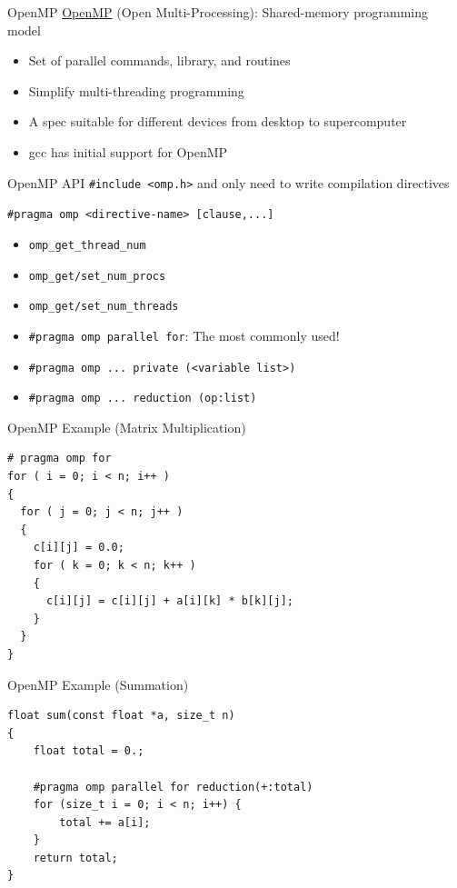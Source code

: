 \documentclass{../TexTemplate/myslide}
\begin{document}
\begin{frame}{OpenMP}
\href{https://www.openmp.org/}{OpenMP} (Open Multi-Processing): Shared-memory programming model
\begin{itemize}
	\item Set of parallel commands, library, and routines
	\item Simplify multi-threading programming
	\item A spec suitable for different devices from desktop to supercomputer
	\item gcc has initial support for OpenMP
\end{itemize}
\end{frame}

\begin{frame}[fragile]{OpenMP API}
\verb'#include <omp.h>' and only need to write compilation directives
\begin{center}
\verb'#pragma omp <directive-name> [clause,...]'
\end{center}
\begin{itemize}
	\item \verb'omp_get_thread_num'
	\item \verb'omp_get/set_num_procs'
	\item \verb'omp_get/set_num_threads'
	\item \verb'#pragma omp parallel for': The most commonly used!
	\item \verb'#pragma omp ... private (<variable list>)'
	\item \verb'#pragma omp ... reduction (op:list)'
\end{itemize}
\end{frame}

\begin{frame}[fragile]{OpenMP Example (Matrix Multiplication)}
\begin{lstlisting}
# pragma omp for
for ( i = 0; i < n; i++ )
{
  for ( j = 0; j < n; j++ )
  {
    c[i][j] = 0.0;
    for ( k = 0; k < n; k++ )
    {
      c[i][j] = c[i][j] + a[i][k] * b[k][j];
    }
  }
}
\end{lstlisting}
\end{frame}

\begin{frame}[fragile]{OpenMP Example (Summation)}
\begin{lstlisting}
float sum(const float *a, size_t n)
{
    float total = 0.;

    #pragma omp parallel for reduction(+:total)
    for (size_t i = 0; i < n; i++) {
        total += a[i];
    }
    return total;
}
\end{lstlisting}
\end{frame}
\end{document}
